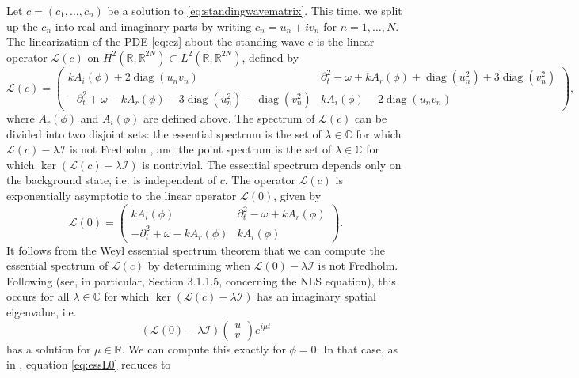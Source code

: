 \documentclass[11pt,reqno]{amsart}
\def\R{{\mathbb R}}
\def\C{{\mathbb C}}
\def\calI{{\mathcal I}}
\def\calL{{\mathcal L}}
\DeclareMathOperator{\diag}{diag}
\begin{document}
Let $c = (c_1, \dots, c_n)$ be a solution to \cref{eq:standingwavematrix}. This time, we split up the $c_n$ into real and imaginary parts by writing $c_n = u_n + i v_n$ for $n = 1, \dots, N$. The linearization of the PDE \cref{eq:cz} about the standing wave $c$ is the linear operator $\calL(c)$ on $H^2(\R, \R^{2N}) \subset L^2(\R, \R^{2N})$, defined by 
\begin{equation}\label{eq:linc}
\calL(c) = \begin{pmatrix}
k A_i(\phi) + 2 \diag(u_n v_n) & \partial_t^2 - \omega + k A_r(\phi) + \diag(u_n^2) + 3 \diag(v_n^2) \\
-\partial_t^2 + \omega - k A_r(\phi) - 3\diag(u_n^2) - \diag(v_n^2) &
k A_i(\phi) - 2 \diag(u_n v_n)
\end{pmatrix},
\end{equation}
where $A_r(\phi)$ and $A_i(\phi)$ are defined above. The spectrum of $\calL(c) $ can be divided into two disjoint sets: the essential spectrum is the set of $\lambda \in \C$ for which $\calL(c) - \lambda \calI$ is not Fredholm \cite[Section 3.1]{Kapitula2013}, and the point spectrum is the set of $\lambda \in \C$ for which $\ker( \calL(c) - \lambda \calI)$ is nontrivial. The essential spectrum depends only on the background state, i.e. is independent of $c$. The operator $\calL(c)$ is exponentially asymptotic to the linear operator $\calL(0)$, given by
\begin{equation}\label{eq:L0}
\calL(0) = \begin{pmatrix}
k A_i(\phi) & \partial_t^2 - \omega + k A_r(\phi)  \\
-\partial_t^2 + \omega - k A_r(\phi) &
k A_i(\phi) 
\end{pmatrix}.
\end{equation}
It follows from the Weyl essential spectrum theorem \cite[Theorem 2.2.6]{Kapitula2013} that we can compute the essential spectrum of $\calL(c)$ by determining when $\calL(0)-\lambda \calI$ is not Fredholm. Following \cite[Section 3.1]{Kapitula2013} (see, in particular, Section 3.1.1.5, concerning the NLS equation), this occurs for all $\lambda \in \C$ for which $\ker( \calL(c) - \lambda \calI)$ has an imaginary spatial eigenvalue, i.e. 
\begin{equation}\label{eq:essL0}
\left(\calL(0)-\lambda \calI \right) \begin{pmatrix}u\\v\end{pmatrix} e^{i \mu t}
\end{equation} 
has a solution for $\mu \in \R$. We can compute this exactly for $\phi = 0$. In that case, as in \cite[Section 3.1.1.5]{Kapitula2013}, equation \cref{eq:essL0} reduces to 
\end{document}
